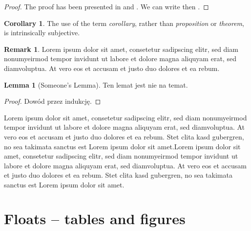 \documentclass[a4paper,11pt,twoside]{report}
\theoremstyle{definition}
\newtheorem{lemma}[theorem]{Lemma}
\newtheorem{corollary}[theorem]{Corollary}
\newtheorem{remark}[theorem]{Remark}
\begin{document}
\begin{proof}
The proof has been presented in \cite{Ktos} and \cite{Innyktos}. We can write then \cite{Ktos, Innyktos}.
\end{proof}

\begin{corollary}
The use of the term \emph{corollary}, rather than \emph{proposition} or \emph{theorem}, is intrinsically subjective.
\end{corollary}




\begin{remark}
Lorem ipsum dolor sit amet, consetetur sadipscing elitr, sed diam nonumyeirmod tempor invidunt ut labore et dolore magna aliquyam erat, sed diamvoluptua. At vero eos et accusam et justo duo dolores et ea rebum.
\end{remark}

\begin{lemma}[Someone's Lemma]
Ten lemat jest nie na temat.
\end{lemma}
\begin{proof} Dowód przez indukcję.
\end{proof}


Lorem ipsum dolor sit amet, consetetur sadipscing elitr, sed diam nonumyeirmod tempor invidunt ut labore et dolore magna aliquyam erat, sed diamvoluptua. At vero eos et accusam et justo duo dolores et ea rebum. Stet clita kasd gubergren, no sea takimata sanctus est Lorem ipsum dolor sit amet.Lorem ipsum dolor sit amet, consetetur sadipscing elitr, sed diam nonumyeirmod tempor invidunt ut labore et dolore magna aliquyam erat, sed diamvoluptua. At vero eos et accusam et justo duo dolores et ea rebum. Stet clita kasd gubergren, no sea takimata sanctus est Lorem ipsum dolor sit amet.



\section{Floats -- tables and figures}
\end{document}
